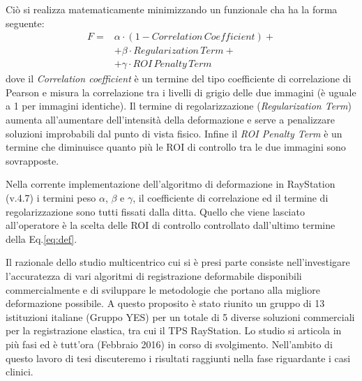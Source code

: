 Ciò si realizza matematicamente minimizzando un funzionale cha ha la forma seguente:
\begin{equation}
\label{eq:def}
\begin{split}
F =& \alpha \cdot (1- Correlation\, Coefficient) + \\
   & + \beta \cdot Regularization\,Term + \\
   & + \gamma \cdot ROI\,Penalty\,Term
\end{split}
\end{equation}
dove il \textit{Correlation coefficient} è un termine del tipo coefficiente di correlazione di Pearson e misura la correlazione tra i livelli di grigio delle due immagini (è uguale a 1 per immagini identiche). Il termine di regolarizzazione (\textit{Regularization Term}) aumenta all'aumentare dell'intensità della deformazione e serve a penalizzare soluzioni improbabili dal punto di vista fisico. Infine il \textit{ROI Penalty Term} è un termine che diminuisce quanto più le ROI di controllo tra le due immagini sono sovrapposte.

Nella corrente implementazione dell'algoritmo di deformazione in RayStation (v.4.7) i termini peso $\alpha$, $\beta$ e $\gamma$, il coefficiente di correlazione ed il termine di regolarizzazione sono tutti fissati dalla ditta. Quello che viene lasciato all'operatore è la scelta delle ROI di controllo controllato dall'ultimo termine della Eq.\eqref{eq:def}.

Il razionale dello studio multicentrico cui si è presi parte consiste nell'investigare l'accuratezza di vari algoritmi di registrazione deformabile disponibili commercialmente e di sviluppare le metodologie che portano alla migliore deformazione possibile. A questo proposito è stato riunito un gruppo di 13 istituzioni italiane (Gruppo YES) per un totale di 5 diverse soluzioni commerciali per la registrazione elastica, tra cui il TPS RayStation. Lo studio si articola in più fasi ed è tutt'ora (Febbraio 2016) in corso di svolgimento. Nell'ambito di questo lavoro di tesi discuteremo i risultati raggiunti nella fase riguardante i casi clinici.


